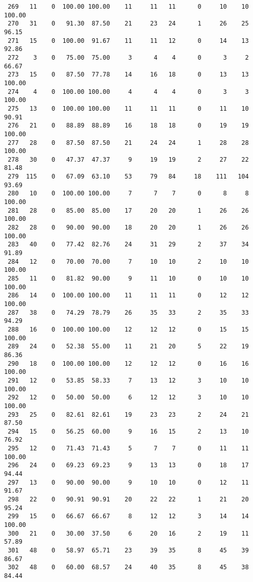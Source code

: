 \begin{verbatim}
 269   11    0  100.00 100.00    11     11   11      0     10    10   100.00
 270   31    0   91.30  87.50    21     23   24      1     26    25    96.15
 271   15    0  100.00  91.67    11     11   12      0     14    13    92.86
 272    3    0   75.00  75.00     3      4    4      0      3     2    66.67
 273   15    0   87.50  77.78    14     16   18      0     13    13   100.00
 274    4    0  100.00 100.00     4      4    4      0      3     3   100.00
 275   13    0  100.00 100.00    11     11   11      0     11    10    90.91
 276   21    0   88.89  88.89    16     18   18      0     19    19   100.00
 277   28    0   87.50  87.50    21     24   24      1     28    28   100.00
 278   30    0   47.37  47.37     9     19   19      2     27    22    81.48
 279  115    0   67.09  63.10    53     79   84     18    111   104    93.69
 280   10    0  100.00 100.00     7      7    7      0      8     8   100.00
 281   28    0   85.00  85.00    17     20   20      1     26    26   100.00
 282   28    0   90.00  90.00    18     20   20      1     26    26   100.00
 283   40    0   77.42  82.76    24     31   29      2     37    34    91.89
 284   12    0   70.00  70.00     7     10   10      2     10    10   100.00
 285   11    0   81.82  90.00     9     11   10      0     10    10   100.00
 286   14    0  100.00 100.00    11     11   11      0     12    12   100.00
 287   38    0   74.29  78.79    26     35   33      2     35    33    94.29
 288   16    0  100.00 100.00    12     12   12      0     15    15   100.00
 289   24    0   52.38  55.00    11     21   20      5     22    19    86.36
 290   18    0  100.00 100.00    12     12   12      0     16    16   100.00
 291   12    0   53.85  58.33     7     13   12      3     10    10   100.00
 292   12    0   50.00  50.00     6     12   12      3     10    10   100.00
 293   25    0   82.61  82.61    19     23   23      2     24    21    87.50
 294   15    0   56.25  60.00     9     16   15      2     13    10    76.92
 295   12    0   71.43  71.43     5      7    7      0     11    11   100.00
 296   24    0   69.23  69.23     9     13   13      0     18    17    94.44
 297   13    0   90.00  90.00     9     10   10      0     12    11    91.67
 298   22    0   90.91  90.91    20     22   22      1     21    20    95.24
 299   15    0   66.67  66.67     8     12   12      3     14    14   100.00
 300   21    0   30.00  37.50     6     20   16      2     19    11    57.89
 301   48    0   58.97  65.71    23     39   35      8     45    39    86.67
 302   48    0   60.00  68.57    24     40   35      8     45    38    84.44

\end{verbatim}
